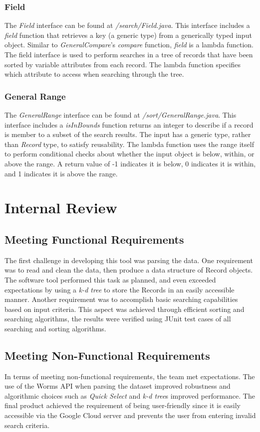 \documentclass{article}
\begin{document}
\subsubsection{Field}
The \textit{Field} interface can be found at \textit{/search/Field.java}. This interface includes a \textit{field} function that retrieves a key (a generic type) from a generically typed input object. Similar to \textit{GeneralCompare}'s \textit{compare} function, \textit{field} is a lambda function. The field interface is used to perform searches in a tree of records that have been sorted by variable attributes from each record. The lambda function specifies which attribute to access when searching through the tree.

\subsubsection{General Range}
The \textit{GeneralRange} interface can be found at \textit{/sort/GeneralRange.java}. This interface includes a \textit{isInBounds} function returns an integer to describe if a record is member to a subset of the search results. The input has a generic type, rather than \textit{Record} type, to satisfy reusability. The lambda function uses the range itself to perform conditional checks about whether the input object is below, within, or above the range. A return value of -1 indicates it is below, 0 indicates it is within, and 1 indicates it is above the range.

\section{Internal Review}
\subsection{Meeting Functional Requirements}
The first challenge in developing this tool was parsing the data. One requirement was to read and clean the data, then produce a data structure of Record objects. The software tool performed this task as planned, and even exceeded expectations by using a \textit{k-d tree} to store the Records in an easily accessible manner. Another requirement was to accomplish basic searching capabilities based on input criteria. This aspect was achieved through efficient sorting and searching algorithms, the results were verified using JUnit test cases of all searching and sorting algorithms.

\subsection{Meeting Non-Functional Requirements}
In terms of meeting non-functional requirements, the team met expectations. The use of the Worms API when parsing the dataset improved robustness and algorithmic choices such as \textit{Quick Select} and \textit{k-d tree}s improved performance. The final product achieved the requirement of being user-friendly since it is easily accessible via the Google Cloud server and prevents the user from entering invalid search criteria. 
\end{document}
